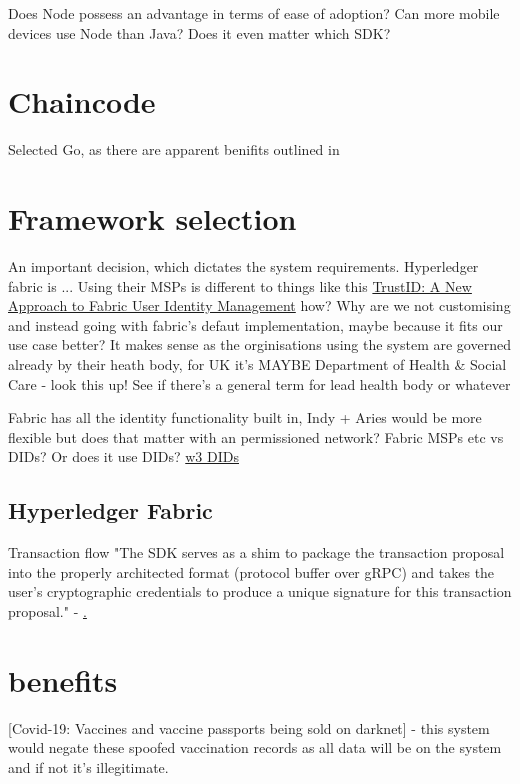 \documentclass{report}
\begin{document}
\begin{flushleft}
Does Node possess an advantage in terms of ease of adoption? Can more mobile devices use Node than Java? Does it even matter which SDK? 


\chapter{Chaincode}
Selected Go, as there are apparent benifits outlined in \cite{foschini_hyperledger_2020}

\chapter{Framework selection}
An important decision, which dictates the system requirements. Hyperledger fabric is ... Using their MSPs is different to things like this \href{'https://www.hyperledger.org/blog/2020/04/21/trustid-a-new-approach-to-fabric-user-identity-management'}{TrustID: A New Approach to Fabric User Identity Management} how? Why are we not customising and instead going with fabric's defaut implementation, maybe because it fits our use case better? It makes sense as the orginisations using the system are governed already by their heath body, for UK it's MAYBE Department of Health \& Social Care - look this up! See if there's a general term for lead health body or whatever

Fabric has all the identity functionality built in, Indy + Aries would be more flexible but does that matter with an permissioned network? Fabric MSPs etc vs DIDs? Or does it use DIDs? \href{'https://www.w3.org/TR/did-core/'}{w3 DIDs}

\section{Hyperledger Fabric}
Transaction flow "The SDK serves as a shim to package the transaction proposal into the properly architected format (protocol buffer over gRPC) and takes the user’s cryptographic credentials to produce a unique signature for this transaction proposal." - \href{"https://hyperledger-fabric.readthedocs.io/en/latest/txflow.html'}.\linebreak[1]



\chapter{benefits}
[Covid-19: Vaccines and vaccine passports being sold on darknet] - this system would negate these spoofed vaccination records as all data will be on the system and if not it's illegitimate.
\linebreak[3]


\end{flushleft}
\end{document}

